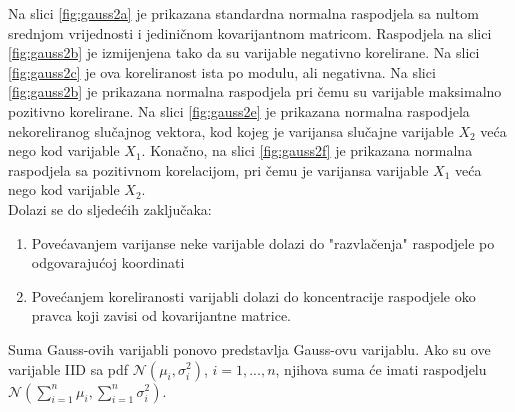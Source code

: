 Na slici \ref{fig:gauss2a} je prikazana standardna normalna raspodjela sa nultom
srednjom vrijednosti i jediničnom kovarijantnom matricom. Raspodjela na slici
\ref{fig:gauss2b} je izmijenjena tako da su varijable negativno korelirane. Na
slici \ref{fig:gauss2c} je ova koreliranost ista po modulu, ali negativna. Na
slici \ref{fig:gauss2b} je prikazana normalna raspodjela pri čemu su varijable
maksimalno pozitivno korelirane. Na slici \ref{fig:gauss2e} je prikazana
normalna raspodjela nekoreliranog slučajnog vektora, kod kojeg je varijansa
slučajne varijable $X_2$ veća nego kod varijable $X_1$. Konačno, na slici
\ref{fig:gauss2f} je prikazana normalna raspodjela sa pozitivnom korelacijom,
pri čemu je varijansa varijable $X_1$ veća nego kod varijable $X_2$.\\

\noindent
Dolazi se do sljedećih zaključaka:
\begin{enumerate}
	\item Povećavanjem varijanse neke varijable dolazi do "razvlačenja" raspodjele
		po odgovarajućoj koordinati
	\item Povećanjem koreliranosti varijabli dolazi do koncentracije raspodjele
		oko pravca koji zavisi od kovarijantne matrice.
\end{enumerate}

\begin{corollary}
  Suma Gauss-ovih varijabli ponovo predstavlja Gauss-ovu varijablu. Ako
  su ove varijable IID sa pdf $\mathcal{N}(\mu_i, \sigma_i^2)$, $i=1,...,n$,
  njihova suma će imati raspodjelu $ \mathcal{N}(\sum_{i=1}^{n}\mu_i,
  \sum_{i=1}^{n}\sigma_i^2)$. %
\end{corollary}

